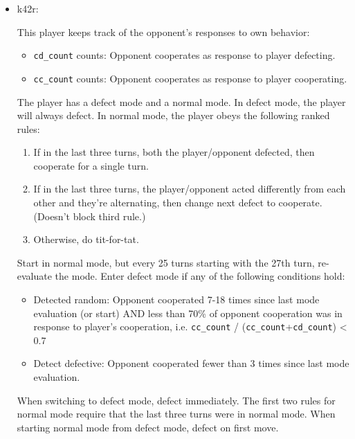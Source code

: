 \documentclass{article}
\begin{document}
\begin{itemize}
\item k42r:

This player keeps track of the opponent's responses to own behavior:

        \begin{itemize}
            \item \texttt{cd\_count} counts: Opponent cooperates as response to player defecting.
            \item \texttt{cc\_count} counts: Opponent cooperates as response to player cooperating.
        \end{itemize}

The player has a defect mode and a normal mode.  In defect mode, the
player will always defect.  In normal mode, the player obeys the following
ranked rules:

        \begin{enumerate}
            \item If in the last three turns, both the player/opponent defected, then
               cooperate for a single turn.
           \item If in the last three turns, the player/opponent acted differently from
               each other and they're alternating, then change next defect to
               cooperate.  (Doesn't block third rule.)
           \item Otherwise, do tit-for-tat.
        \end{enumerate}

Start in normal mode, but every 25 turns starting with the 27th turn,
re-evaluate the mode.  Enter defect mode if any of the following
conditions hold:

        \begin{itemize}
            \item Detected random:  Opponent cooperated 7-18 times since last mode
  evaluation (or start) AND less than 70\% of opponent cooperation was in
  response to player's cooperation, i.e.
        \texttt{cc\_count} / (\texttt{cc\_count}+\texttt{cd\_count}) < 0.7
    \item Detect defective:  Opponent cooperated fewer than 3 times since last mode
  evaluation.
        \end{itemize}

When switching to defect mode, defect immediately.  The first two rules for
normal mode require that the last three turns were in normal mode.  When starting
normal mode from defect mode, defect on first move.


\end{itemize}
\end{document}
